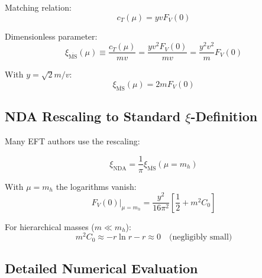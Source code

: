 \documentclass[12pt,a4paper]{report}
\begin{document}
	Matching relation:
	\begin{equation}
		c_T(\mu) = y v F_V(0)
	\end{equation}
	
	Dimensionless parameter:
	\begin{equation}
		\xi_{\overline{\text{MS}}}(\mu) \equiv \frac{c_T(\mu)}{mv} = \frac{yv^2F_V(0)}{mv} = \frac{y^2v^2}{m}F_V(0)
	\end{equation}
	
	With $y = \sqrt{2} m/v$:
	\begin{equation}
		\xi_{\overline{\text{MS}}}(\mu) = 2mF_V(0)
	\end{equation}
	
	\subsection{NDA Rescaling to Standard $\xi$-Definition}
	
	Many EFT authors use the rescaling:
	
	\begin{equation}
		\xi_{\text{NDA}} = \frac{1}{\pi} \xi_{\overline{\text{MS}}}(\mu = m_h)
	\end{equation}
	
	With $\mu = m_h$ the logarithms vanish:
	\begin{equation}
		F_V(0)|_{\mu=m_h} = \frac{y^2}{16\pi^2}\left[\frac{1}{2} + m^2C_0\right]
	\end{equation}
	
	For hierarchical masses ($m \ll m_h$):
	\begin{equation}
		m^2C_0 \approx -r \ln r - r \approx 0 \quad \text{(negligibly small)}
	\end{equation}
	
	\subsection{Detailed Numerical Evaluation}
	
\end{document}
